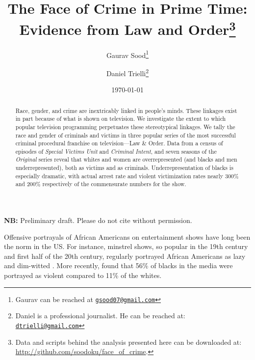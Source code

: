 \documentclass[12pt, letterpaper]{article}
\title{\Large{The Face of Crime in Prime Time:\\ Evidence from Law and Order}\footnote{Data and scripts behind the analysis presented here can be downloaded at: \url{http://github.com/soodoku/face_of_crime}.}}
\author{Gaurav Sood\thanks{Gaurav can be reached at \href{mailto:gsood07@gmail.com}{\footnotesize{\texttt{gsood07@gmail.com}}}} \and Daniel Trielli\thanks{Daniel is a professional journalist. He can be reached at: \href{mailto:dtrielli@gmail.com}{\footnotesize{\texttt{dtrielli@gmail.com}}}}\vspace{.5cm}}
\date{\vspace{.5cm}\normalsize{\today}}
\begin{document}
\maketitle

\begin{center}
\vspace{.5cm}\textbf{NB:} Preliminary draft. Please do not cite without permission.\vspace{1.5cm}
\end{center}

\begin{abstract}
\noindent Race, gender, and crime are inextricably linked in people's minds. These linkages exist in part because of what is shown on television. We investigate the extent to which popular television programming perpetuates these stereotypical linkages. We tally the race and gender of criminals and victims in three popular series of the most successful criminal procedural franchise on television---Law \& Order. Data from a census of episodes of \textit{Special Victims Unit} and \textit{Criminal Intent}, and seven seasons of the \textit{Original} series reveal that whites and women are overrepresented (and blacks and men underrepresented), both as victims and as criminals. Underrepresentation of blacks is especially dramatic, with actual arrest rate and violent victimization rates nearly 300\% and 200\% respectively of the commensurate numbers for the show. 
\end{abstract}
\clearpage
\doublespace

Offensive portrayals of African Americans on entertainment shows have long been the norm in the US. For instance, minstrel shows, so popular in the 19th century and first half of the 20th century, regularly portrayed African Americans as lazy and dim-witted \citep{dates1993split, toll1974blacking}. More recently, \citet{entman2001black} found that 56\% of blacks in the media were portrayed as violent compared to 11\% of the whites.
\end{document}
